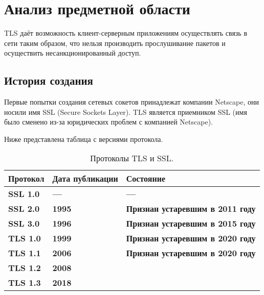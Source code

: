 \chapter{Анализ предметной области}

	TLS даёт возможность клиент-серверным приложениям осуществлять связь в сети таким образом, что нельзя производить прослушивание пакетов и осуществить несанкционированный доступ. 
    
    \section{История создания}
    
    Первые попытки создания сетевых сокетов принадлежат компании Netscape, они носили имя SSL (Secure Sockets Layer). TLS является приемником SSL (имя было сменено из-за юридических проблем с компанией Netscape). 
    
    Ниже представлена таблица с версиями протокола.
    
    \begin{table}[h!]
    	\begin{center}
    		\caption{Протоколы TLS и SSL.}
    		\label{tbl:version}
    		\begin{tabular}{|p{2.5cm}|p{4.5cm}|p{8.5cm}|}
    			\hline \textbf{Протокол} & \textbf{Дата публикации} & \textbf{Состояние}  \\
    			\hline \textbf{SSL 1.0 } & \textbf{---} & \textbf{---} \\
    			\hline \textbf{SSL 2.0 } & \textbf{1995} & \textbf{Признан устаревшим в 2011 году}  \\
    			\hline \textbf{SSL 3.0 } & \textbf{1996} & \textbf{Признан устаревшим в 2015 году} \\
    			\hline \textbf{TLS 1.0 } & \textbf{1999} & \textbf{Признан устаревшим в 2020 году}  \\
    			\hline \textbf{TLS 1.1 } & \textbf{2006} & \textbf{Признан устаревшим в 2020 году}  \\
    			\hline \textbf{TLS 1.2 } & \textbf{2008} & \textbf{} \\
    			\hline \textbf{TLS 1.3 } & \textbf{2018} & \textbf{} \\
    			\hline
    		\end{tabular}
    	\end{center} 		
    	
    \end{table}
    
